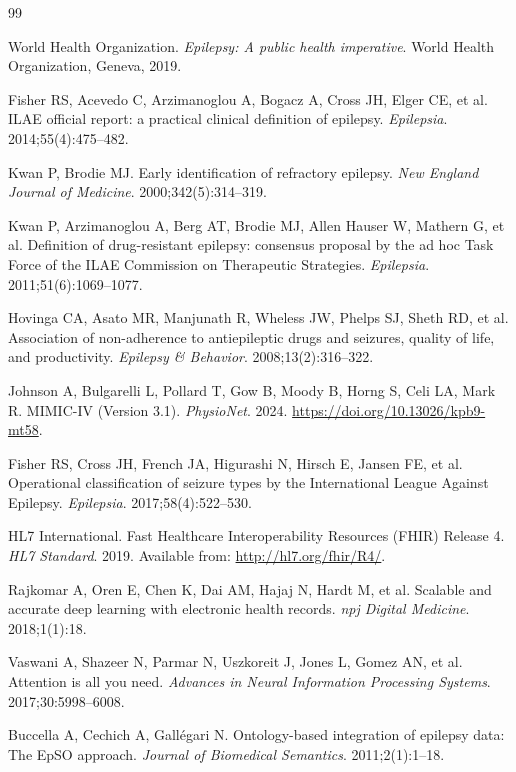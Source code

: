 \documentclass[11pt,a4paper]{article}
\begin{document}
\begin{thebibliography}{99}

World Health Organization. \textit{Epilepsy: A public health imperative}. World Health Organization, Geneva, 2019.

Fisher RS, Acevedo C, Arzimanoglou A, Bogacz A, Cross JH, Elger CE, et al. ILAE official report: a practical clinical definition of epilepsy. \textit{Epilepsia}. 2014;55(4):475--482.

Kwan P, Brodie MJ. Early identification of refractory epilepsy. \textit{New England Journal of Medicine}. 2000;342(5):314--319.

Kwan P, Arzimanoglou A, Berg AT, Brodie MJ, Allen Hauser W, Mathern G, et al. Definition of drug-resistant epilepsy: consensus proposal by the ad hoc Task Force of the ILAE Commission on Therapeutic Strategies. \textit{Epilepsia}. 2011;51(6):1069--1077.

Hovinga CA, Asato MR, Manjunath R, Wheless JW, Phelps SJ, Sheth RD, et al. Association of non-adherence to antiepileptic drugs and seizures, quality of life, and productivity. \textit{Epilepsy \& Behavior}. 2008;13(2):316--322.

Johnson A, Bulgarelli L, Pollard T, Gow B, Moody B, Horng S, Celi LA, Mark R. MIMIC-IV (Version 3.1). \textit{PhysioNet}. 2024. \url{https://doi.org/10.13026/kpb9-mt58}.

Fisher RS, Cross JH, French JA, Higurashi N, Hirsch E, Jansen FE, et al. Operational classification of seizure types by the International League Against Epilepsy. \textit{Epilepsia}. 2017;58(4):522--530.

HL7 International. Fast Healthcare Interoperability Resources (FHIR) Release 4. \textit{HL7 Standard}. 2019. Available from: \url{http://hl7.org/fhir/R4/}.

Rajkomar A, Oren E, Chen K, Dai AM, Hajaj N, Hardt M, et al. Scalable and accurate deep learning with electronic health records. \textit{npj Digital Medicine}. 2018;1(1):18.

Vaswani A, Shazeer N, Parmar N, Uszkoreit J, Jones L, Gomez AN, et al. Attention is all you need. \textit{Advances in Neural Information Processing Systems}. 2017;30:5998--6008.

Buccella A, Cechich A, Gallégari N. Ontology-based integration of epilepsy data: The EpSO approach. \textit{Journal of Biomedical Semantics}. 2011;2(1):1--18.


\end{thebibliography}
\end{document}
